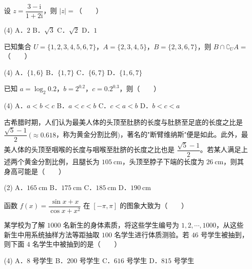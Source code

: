 \begin{question}
设 $z=\dfrac{3-\mathrm i}{1+2\mathrm i}$，则 $|z|=$\mbox{（　　）}

\begin{gkopts}(4)
\task A．$2$
\task B．$\sqrt3$
\task C．$\sqrt2$
\task D．$1$
\end{gkopts}

\end{question}
\begin{question}
已知集合 $U=\{1,2,3,4,5,6,7\}$，$A=\{2,3,4,5\}$，$B=\{2,3,6,7\}$，则 $B\cap\complement_U A=$\mbox{（　　）}

\begin{gkopts}(4)
\task A．$\{1,6\}$
\task B．$\{1,7\}$
\task C．$\{6,7\}$
\task D．$\{1,6,7\}$
\end{gkopts}

\end{question}
\begin{question}
已知 $a=\log_2 0.2$，$b=2^{0.2}$，$c=0.2^{0.3}$，则\mbox{（　　）}

\begin{gkopts}(4)
\task A．$a<b<c$
\task B．$a<c<b$
\task C．$c<a<b$
\task D．$b<c<a$
\end{gkopts}

\end{question}
\begin{question}
古希腊时期，人们认为最美人体的头顶至肚脐的长度与肚脐至足底的长度之比是 $\dfrac{\sqrt5-1}2\ (\approx0.618$，称为黄金分割比例$)$，著名的"断臂维纳斯"便是如此。此外，最美人体的头顶至咽喉的长度与咽喉至肚脐的长度之比也是 $\dfrac{\sqrt5-1}2$。若某人满足上述两个黄金分割比例，且腿长为 $105\ \mathrm{cm}$，头顶至脖子下端的长度为 $26\ \mathrm{cm}$，则其身高可能是\mbox{（　　）}

\begin{gkopts}(2)
\task A．$165\ \mathrm{cm}$
\task B．$175\ \mathrm{cm}$
\task C．$185\ \mathrm{cm}$
\task D．$190\ \mathrm{cm}$
\end{gkopts}

\Needspace{0.4\textheight}
\end{question}
\begin{question}
函数 $f(x)=\dfrac{\sin x+x}{\cos x+x^{2}}$ 在 $[-\pi,\pi]$ 的图象大致为\mbox{（　　）}
\nopagebreak[4]
\begin{center}\end{center}
\nopagebreak[4]
\end{question}
\begin{question}
某学校为了解 $1000$ 名新生的身体素质，将这些学生编号为 $1,2,\cdots,1000$，从这些新生中用系统抽样方法等距抽取 $100$ 名学生进行体质测验。若 $46$ 号学生被抽到，则下面 $4$ 名学生中被抽到的是\mbox{（　　）}

\begin{gkopts}(4)
\task A．$8$ 号学生
\task B．$200$ 号学生
\task C．$616$ 号学生
\task D．$815$ 号学生
\end{gkopts}

\end{question}
